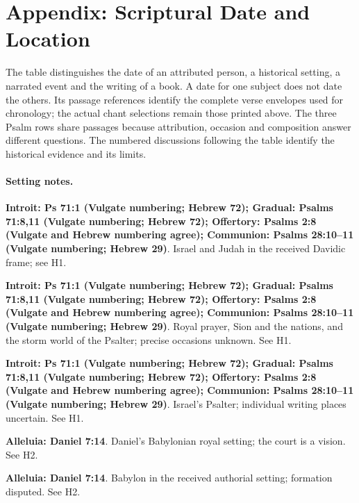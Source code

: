 \clearpage
\section{Appendix: Scriptural Date and Location}
\label{sec:date-location}

The table distinguishes the date of an attributed person, a historical setting, a narrated event and the writing of a book. A date for one subject does not date the others. Its passage references identify the complete verse envelopes used for chronology; the actual chant selections remain those printed above. The three Psalm rows share passages because attribution, occasion and composition answer different questions. The numbered discussions following the table identify the historical evidence and its limits.



\paragraph{Setting notes.}
\noindent\textbf{Introit: Ps 71:1 (Vulgate numbering; Hebrew 72); Gradual: Psalms 71:8,11 (Vulgate numbering; Hebrew 72); Offertory: Psalms 2:8 (Vulgate and Hebrew numbering agree); Communion: Psalms 28:10--11 (Vulgate numbering; Hebrew 29)}. Israel and Judah in the received Davidic frame; see H1.

\noindent\textbf{Introit: Ps 71:1 (Vulgate numbering; Hebrew 72); Gradual: Psalms 71:8,11 (Vulgate numbering; Hebrew 72); Offertory: Psalms 2:8 (Vulgate and Hebrew numbering agree); Communion: Psalms 28:10--11 (Vulgate numbering; Hebrew 29)}. Royal prayer, Sion and the nations, and the storm world of the Psalter; precise occasions unknown. See H1.

\noindent\textbf{Introit: Ps 71:1 (Vulgate numbering; Hebrew 72); Gradual: Psalms 71:8,11 (Vulgate numbering; Hebrew 72); Offertory: Psalms 2:8 (Vulgate and Hebrew numbering agree); Communion: Psalms 28:10--11 (Vulgate numbering; Hebrew 29)}. Israel's Psalter; individual writing places uncertain. See H1.

\noindent\textbf{Alleluia: Daniel 7:14}. Daniel's Babylonian royal setting; the court is a vision. See H2.

\noindent\textbf{Alleluia: Daniel 7:14}. Babylon in the received authorial setting; formation disputed. See H2.

